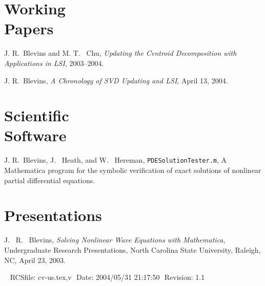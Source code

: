 \documentclass[margin,line,11pt,draft]{res}
\begin{document}
\begin{resume}
\section{\sc Working \\Papers}

J. R.\ Blevins and M. T. \ Chu, {\em Updating the Centroid
Decomposition with Applications in LSI}, 2003--2004.

J. R.\ Blevins, {\em A Chronology of SVD Updating and LSI}, April 13, 2004.

\section{\sc Scientific \\Software}

J. R.\ Blevins, J. \ Heath, and W. \ Hereman,
  \texttt{PDESolutionTester.m},  A Mathematica program for the symbolic
  verification of exact solutions of nonlinear partial differential
  equations.

\section{\sc Presentations}


J. \ R. \ Blevins, {\em Solving Nonlinear Wave Equations with Mathematica},
Undergraduate Research Presentations, North Carolina State University,
Raleigh, NC, April 23, 2003.


\vspace{\fill}\ \newline
{\tiny \rm $ $RCSfile: cv-us.tex,v $ $ }
{\tiny \rm $ $Date: 2004/05/31 21:17:50 $ $ }
{\tiny \rm $ $Revision: 1.1 $ $ }
\end{resume}
\end{document}
